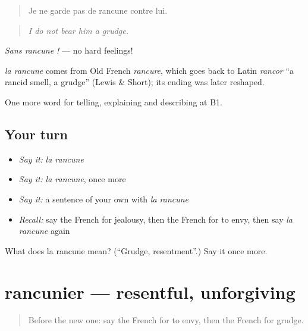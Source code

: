 \begin{quote}
Je ne garde pas de rancune contre lui.
\end{quote}

\begin{quote}
\emph{I do not bear him a grudge.}
\end{quote}

\emph{Sans rancune !} — no hard feelings!

\begin{cousinweb}
\emph{la rancune} comes from Old French \emph{rancure}, which goes back to Latin \emph{rancor} \textquotedblleft{}a rancid smell, a grudge\textquotedblright{} (Lewis \& Short); its ending was later reshaped.
\end{cousinweb}

\begin{grammarlens}[title={What you've built}]
One more word for telling, explaining and describing at B1.
\end{grammarlens}

\subsection*{Your turn}
\begin{itemize}
\raggedright
  \item \emph{Say it:} \emph{la rancune}
  \item \emph{Say it:} \emph{la rancune}, once more
  \item \emph{Say it:} a sentence of your own with \emph{la rancune}
  \item \emph{Recall:} say the French for jealousy, then the French for to envy, then say \emph{la rancune} again
\end{itemize}

\begin{tcolorbox}[breakable,colback=teal!4,colframe=teal!35!black,title={Before you move on}]
What does la rancune mean? (\textquotedblleft{}Grudge, resentment\textquotedblright{}.) Say it once more.
\end{tcolorbox}
\section[rancunier]{rancunier — resentful, unforgiving}

\label{lesson:FR-C475-rancunier}



\begin{quote}
Before the new one: say the French for to envy, then the French for grudge.
\end{quote}

